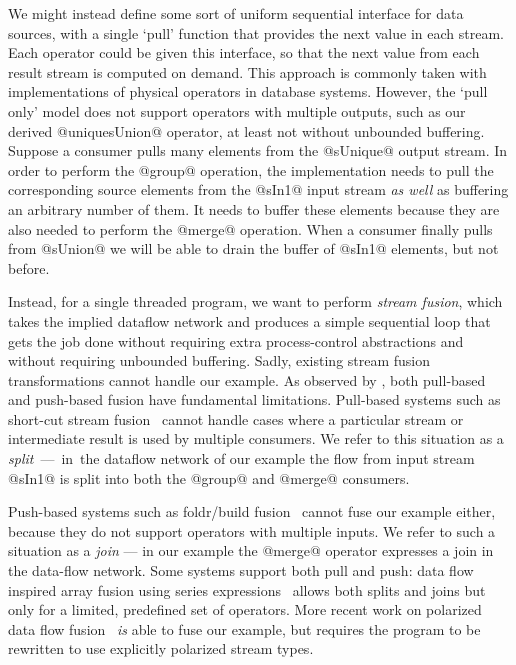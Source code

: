 We might instead define some sort of uniform sequential interface for data sources, with a single `pull' function that provides the next value in each stream. Each operator could be given this interface, so that the next value from each result stream is computed on demand. This approach is commonly taken with implementations of physical operators in database systems. However, the `pull only' model does not support operators with multiple outputs, such as our derived @uniquesUnion@ operator, at least not without unbounded buffering. Suppose a consumer pulls many elements from the @sUnique@ output stream. In order to perform the @group@ operation, the implementation needs to pull the corresponding source elements from the @sIn1@ input stream \emph{as well} as buffering an arbitrary number of them. It needs to buffer these elements because they are also needed to perform the @merge@ operation. When a consumer finally pulls from @sUnion@ we will be able to drain the buffer of @sIn1@ elements, but not before.

Instead, for a single threaded program, we want to perform \emph{stream fusion}, which takes the implied dataflow network and produces a simple sequential loop that gets the job done without requiring extra process-control abstractions and without requiring unbounded buffering. Sadly, existing stream fusion transformations cannot handle our example. As observed by \citet{kay2009you}, both pull-based and push-based fusion have fundamental limitations. Pull-based systems such as short-cut stream fusion~\cite{coutts2007stream} cannot handle cases where a particular stream or intermediate result is used by multiple consumers. We refer to this situation as a \mbox{\emph{split} --- in the} dataflow network of our example the flow from input stream @sIn1@ is split into both the @group@ and @merge@ consumers. 

Push-based systems such as foldr/build fusion~\cite{gill1993short} cannot fuse our example either, because they do not support operators with multiple inputs. We refer to such a situation as a \emph{join} --- in our example the @merge@ operator expresses a join in the data-flow network. Some systems support both pull and push: data flow inspired array fusion using series expressions~\cite{lippmeier2013data} allows both splits and joins but only for a limited, predefined set of operators. More recent work on polarized data flow fusion~\cite{lippmeier2016polarized} \emph{is} able to fuse our example, but requires the program to be rewritten to use explicitly polarized stream types. 

